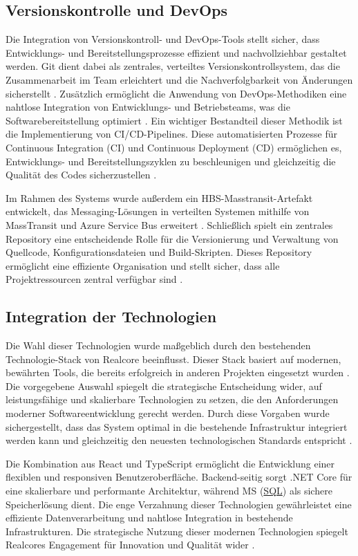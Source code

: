 \subsection*{Versionskontrolle und DevOps}
Die Integration von Versionskontroll- und DevOps-Tools stellt sicher, dass Entwicklungs- und Bereitstellungsprozesse effizient und nachvollziehbar gestaltet werden. Git dient dabei als zentrales, verteiltes Versionskontrollsystem, das die Zusammenarbeit im Team erleichtert und die Nachverfolgbarkeit von Änderungen sicherstellt \cite{chacon2021git, loeliger2012git}. Zusätzlich ermöglicht die Anwendung von DevOps-Methodiken eine nahtlose Integration von Entwicklungs- und Betriebsteams, was die Softwarebereitstellung optimiert \cite{azureDevOps, kim2020devops}. Ein wichtiger Bestandteil dieser Methodik ist die Implementierung von CI/CD-Pipelines. Diese automatisierten Prozesse für Continuous Integration (CI) und Continuous Deployment (CD) ermöglichen es, Entwicklungs- und Bereitstellungszyklen zu beschleunigen und gleichzeitig die Qualität des Codes sicherzustellen \cite{fowler2020continuous}. 

Im Rahmen des Systems wurde außerdem ein HBS-Masstransit-Artefakt entwickelt, das Messaging-Lösungen in verteilten Systemen mithilfe von MassTransit und Azure Service Bus erweitert \cite{masstransit2021, masstransitAzure2022}. Schließlich spielt ein zentrales Repository eine entscheidende Rolle für die Versionierung und Verwaltung von Quellcode, Konfigurationsdateien und Build-Skripten. Dieses Repository ermöglicht eine effiziente Organisation und stellt sicher, dass alle Projektressourcen zentral verfügbar sind \cite{azureRepos2023}.


\subsection*{Integration der Technologien} Die Wahl dieser Technologien wurde maßgeblich durch den bestehenden Technologie-Stack von Realcore beeinflusst. Dieser Stack basiert auf modernen, bewährten Tools, die bereits erfolgreich in anderen Projekten eingesetzt wurden \cite{chhajed2015elk, wilson2018mern}. Die vorgegebene Auswahl spiegelt die strategische Entscheidung wider, auf leistungsfähige und skalierbare Technologien zu setzen, die den Anforderungen moderner Softwareentwicklung gerecht werden. Durch diese Vorgaben wurde sichergestellt, dass das System optimal in die bestehende Infrastruktur integriert werden kann und gleichzeitig den neuesten technologischen Standards entspricht \cite{sharma2018fullstack}.

Die Kombination aus React und TypeScript ermöglicht die Entwicklung einer flexiblen und responsiven Benutzeroberfläche. Backend-seitig sorgt .NET Core für eine skalierbare und performante Architektur, während MS (\hyperref[abkuerzungen]{SQL}) als sichere Speicherlösung dient. Die enge Verzahnung dieser Technologien gewährleistet eine effiziente Datenverarbeitung und nahtlose Integration in bestehende Infrastrukturen. Die strategische Nutzung dieser modernen Technologien spiegelt Realcores Engagement für Innovation und Qualität wider \cite{mccreary2009xrx}.